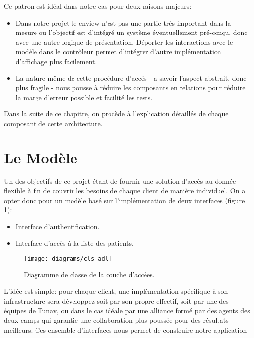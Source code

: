 Ce patron est idéal dans notre cas pour deux raisons majeurs:
\begin{itemize} 

\item Dans notre projet le en{view} n'est pas une partie très important
dans la mesure ou l'objectif est d'intégré un système éventuellement
pré-conçu, donc avec une autre logique de présentation. Déporter les
interactions avec le modèle dans le contrôleur permet d'intégrer
d'autre implémentation d'affichage plus facilement.

\item La nature même de cette procédure d'accés - a savoir l’aspect
abstrait, donc plus fragile - nous pousse à réduire les composants en
relations pour réduire la marge d'erreur possible et facilité les tests.

\end{itemize} 

Dans la suite de ce chapitre, on procède à l'explication détaillés de chaque composant de cette architecture.

\section{Le Modèle} 


Un des objectifs de ce projet étant de fournir une solution d’accès au
donnée flexible à fin de couvrir les besoins de chaque client de manière
individuel. On a opter donc pour un modèle basé sur l’implémentation de
deux interfaces (figure \ref{fig:adl}):

\begin{itemize}
\item Interface d'authentification.
\item Interface d’accès à la liste des patients.
\end{itemize}

\begin{figure}
\center
\texttt{[image: diagrams/cls\_adl]}
\caption{Diagramme de classe de la couche d'accées.}
\label{fig:adl}
\end{figure}

L'idée est simple: pour chaque client, une implémentation spécifique à son infrastructure sera développez soit par son propre effectif, soit par une des équipes de Tunav, ou dans le cas idéale par une alliance formé par des agents des deux camps qui garantie une collaboration plus poussée pour des résultats meilleurs.
Ces ensemble d'interfaces nous permet de construire notre application 

